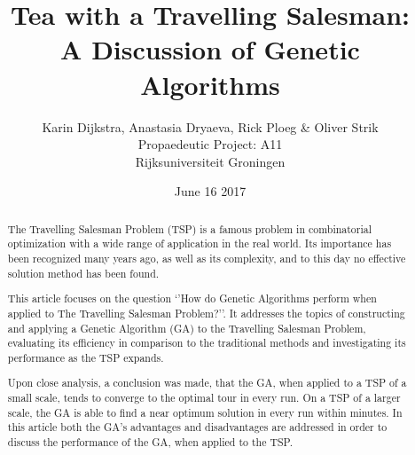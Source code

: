 \documentclass[11pt,a4paper]{article}
\title{Tea with a Travelling Salesman:\\
	\large A Discussion of Genetic Algorithms}
\author{Karin Dijkstra, Anastasia Dryaeva, Rick Ploeg \& Oliver Strik\\
Propaedeutic Project: A11\\
Rijksuniversiteit Groningen}
\date{June 16 2017}
\begin{document}
\maketitle
\clearpage
\begin{abstract}
The Travelling Salesman Problem (TSP) is a famous problem in combinatorial optimization with a wide range of application in the real world. Its importance has been recognized many years ago, as well as its complexity, and to this day no effective solution method has been found.

This article focuses on the question ‘’How do Genetic Algorithms perform when applied to The Travelling Salesman Problem?’’. It addresses the topics of constructing and applying a Genetic Algorithm (GA) to the Travelling Salesman Problem, evaluating its efficiency in comparison to the traditional methods and investigating its performance as the TSP expands.

Upon close analysis, a conclusion was made, that the GA, when applied to a TSP of a small scale, tends to converge to the optimal tour in every run. On a TSP of a larger scale, the GA is able to find a near optimum solution in every run within minutes. In this article both the GA's advantages and disadvantages are addressed in order to discuss the performance of the GA, when applied to the TSP. 
\end{abstract}

\clearpage
\tableofcontents










\appendix

\end{document}
